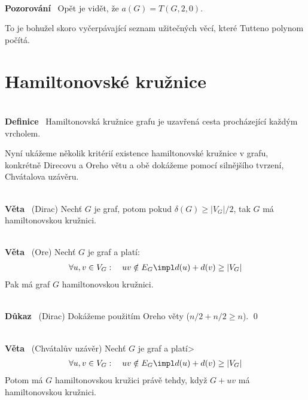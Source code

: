 \documentclass{article}
\renewcommand{\paragraph}[1]{\ \\\smallskip\noindent\textbf{#1}\ }
\begin{document}
\paragraph{Pozorování} Opět je vidět, že $a(G) = T(G, 2, 0)$.

\bigskip

\noindent To je bohužel skoro vyčerpávající seznam užitečných věcí, které 
Tutteno polynom počítá.

\section{Hamiltonovské kružnice}
\paragraph{Definice} Hamiltonovská kružnice grafu je uzavřená cesta procházející 
každým vrcholem.

Nyní ukážeme několik kritérií existence hamiltonovské kružnice v grafu, 
konkrétně Direcovu a Oreho větu a obě dokážeme pomocí silnějšího tvrzení, 
Chvátalova uzávěru.

\paragraph{Věta} (Dirac) Nechť $G$ je graf, potom pokud $\delta(G) \geq 
|V_G|/2$, tak $G$ má hamiltonovskou kružnici.

\paragraph{Věta} (Ore) Nechť $G$ je graf a platí:
\begin{align}
	\forall u,v \in V_G: \quad uv\notin E_G \impl d(u) + d(v) \geq |V_G|
\end{align}
Pak má graf $G$ hamiltonovskou kružnici.

\paragraph{Důkaz} (Dirac) Dokážeme použitím Oreho věty ($n/2 + n/2 \geq n$).  
\qed

\paragraph{Věta} (Chvátalův uzávěr) Nechť $G$ je graf a platí>
\begin{align}
	\forall u,v \in V_G: \quad uv\notin E_G \impl d(u) + d(v) \geq |V_G|
\end{align}
Potom má $G$ hamiltonovskou kružici právě tehdy, když $G+uv$ má hamiltonovskou 
kružnici.
\end{document}
